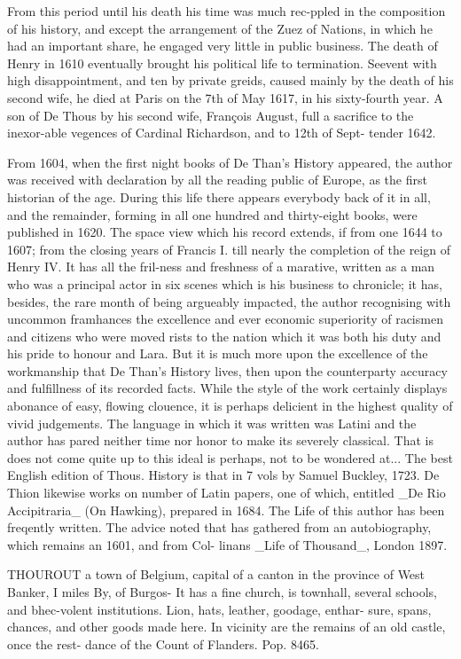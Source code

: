 \documentclass{article}
\begin{document}
From this period until his death his time was much rec-ppled in the composition of his history, and except the arrangement of the Zuez of Nations, in which he had an important share, he engaged very little in public business. The death of Henry in 1610 eventually brought his political life to termination. Seevent with high disappointment, and ten by private greids, caused mainly by the death of his second wife, he died at Paris on the 7th of May 1617, in his sixty-fourth year. A son of De Thous by his second wife, François August, full a sacrifice to the inexor-able vegences of Cardinal Richardson, and to 12th of Sept- tender 1642.

From 1604, when the first night books of De Than’s History appeared, the author was received with declaration by all the reading public of Europe, as the first historian of the age. During this life there appears everybody back of it in all, and the remainder, forming in all one hundred and thirty-eight books, were published in 1620. The space view which his record extends, if from one 1644 to 1607; from the closing years of Francis I. till nearly the completion of the reign of Henry IV. It has all the fril-ness and freshness of a marative, written as a man who was a principal actor in six scenes which is his business to chronicle; it has, besides, the rare month of being argueably impacted, the author recognising with uncommon framhances the excellence and ever economic superiority of racismen and citizens who were moved rists to the nation which it was both his duty and his pride to honour and Lara. But it is much more upon the excellence of the workmanship that De Than’s History lives, then upon the counterparty accuracy and fulfillness of its recorded facts. While the style of the work certainly displays abonance of easy, flowing clouence, it is perhaps delicient in the highest quality of vivid judgements. The language in which it was written was Latini and the author has pared neither time nor honor to make its severely classical. That is does not come quite up to this ideal is perhaps, not to be wondered at... The best English edition of Thous. History is that in 7 vols by Samuel Buckley, 1723. De Thion likewise works on number of Latin papers, one of which, entitled \_De Rio Accipitraria\_ (On Hawking), prepared in 1684. The Life of this author has been freqently written. The advice noted that has gathered from an autobiography, which remains an 1601, and from Col- linans \_Life of Thousand\_, London 1897.

THOUROUT a town of Belgium, capital of a canton in the province of West Banker, I miles By, of Burgos- It has a fine church, is townhall, several schools, and bhec-volent institutions. Lion, hats, leather, goodage, enthar- sure, spans, chances, and other goods made here. In vicinity are the remains of an old castle, once the rest- dance of the Count of Flanders. Pop. 8465.
\end{document}
